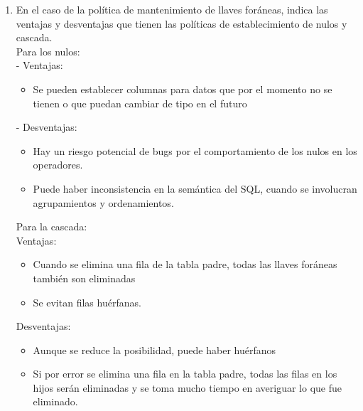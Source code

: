 \documentclass{article}
\begin{document}
\begin{enumerate}
\item[6.] En el caso de la política de mantenimiento de llaves foráneas, indica las ventajas y desventajas que tienen las políticas de establecimiento de nulos y cascada.
\\
Para los nulos:\\
- Ventajas:
\begin{itemize}
    \item Se pueden establecer columnas para datos que por el momento no se tienen o que puedan cambiar de tipo en el futuro
\end{itemize}

- Desventajas:
\begin{itemize}
    \item Hay un riesgo potencial de bugs por el comportamiento de los nulos en los operadores.
    \item Puede haber inconsistencia en la semántica del SQL, cuando se involucran agrupamientos y ordenamientos.
\end{itemize}
Para la cascada:
\\
Ventajas:
\begin{itemize}
    \item Cuando se elimina una fila de la tabla padre, todas las llaves foráneas también son eliminadas
    \item Se evitan filas huérfanas.
\end{itemize}

Desventajas:
\begin{itemize}
    \item Aunque se reduce la posibilidad, puede haber huérfanos
    \item Si por error se elimina una fila en la tabla padre, todas las filas en los hijos serán eliminadas y se toma mucho tiempo en averiguar lo que fue eliminado.
\end{itemize}


    
\end{enumerate}
\end{document}
